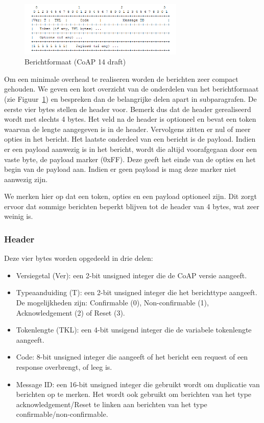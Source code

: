 \begin{figure}
\vspace{-20pt}
\includegraphics[width=0.7\textwidth]{fig/CoAPMessageFormat}
\vspace{-30pt}
\caption{Berichtformaat (CoAP 14 draft)}
\vspace{-10pt}
\label{fig:CoAPMessageFormat}
\end{figure}
Om een minimale overhead te realiseren worden de berichten zeer compact gehouden. We geven een kort overzicht van de onderdelen van het berichtformaat (zie Figuur~\ref{fig:CoAPMessageFormat}) en bespreken dan de belangrijke delen apart in subparagrafen. De eerste vier bytes stellen de header voor. Bemerk dus dat de header gerealiseerd wordt met slechts 4 bytes. Het veld na de header is optioneel en bevat een token waarvan de lengte aangegeven is in de header. Vervolgens zitten er nul of meer opties in het bericht.
Het laatste onderdeel van een bericht is de payload. Indien er een payload aanwezig is in het bericht, wordt die altijd voorafgegaan door een vaste byte, de payload marker (0xFF). Deze geeft het einde van de opties en het begin van de payload aan. Indien er geen payload is mag deze marker niet aanwezig zijn.

We merken hier op dat een token, opties en een payload optioneel zijn. Dit zorgt ervoor dat sommige berichten beperkt blijven tot de header van 4 bytes, wat zeer weinig is.

\subsubsection{Header}

Deze vier bytes worden opgedeeld in drie delen:
\begin{itemize}
\item Versiegetal (Ver): een 2-bit unsigned integer die de CoAP versie aangeeft. 
\item Typeaanduiding (T): een 2-bit unsigned integer die het berichttype aangeeft. De mogelijkheden zijn: Confirmable (0), Non-confirmable (1), Acknowledgement (2) of Reset (3).
\item Tokenlengte (TKL): een 4-bit unsigend integer die de variabele tokenlengte aangeeft.
\item Code: 8-bit unsigned integer die aangeeft of het bericht een request of een response overbrengt, of leeg is.
\item Message ID: een 16-bit unsigned integer die gebruikt wordt om duplicatie van berichten op te merken. Het wordt ook gebruikt om berichten van het type acknowledgement/Reset te linken aan berichten van het type confirmable/non-confirmable.
\end{itemize}

